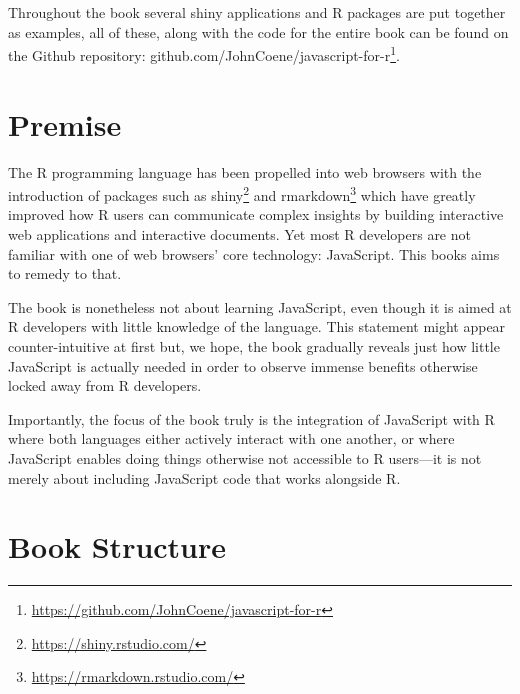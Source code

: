 \documentclass[
]{krantz}
\renewcommand{\href}[2]{#2\footnote{\url{#1}}}
\begin{document}
Throughout the book several shiny applications and R packages are put together as examples, all of these, along with the code for the entire book can be found on the Github repository: \href{https://github.com/JohnCoene/javascript-for-r}{github.com/JohnCoene/javascript-for-r}.

\hypertarget{premise}{%
\section*{Premise}\label{premise}}


The R programming language has been propelled into web browsers with the introduction of packages such as \href{https://shiny.rstudio.com/}{shiny} \citep{R-shiny} and \href{https://rmarkdown.rstudio.com/}{rmarkdown} \citep{R-rmarkdown} which have greatly improved how R users can communicate complex insights by building interactive web applications and interactive documents. Yet most R developers are not familiar with one of web browsers' core technology: JavaScript. This books aims to remedy to that.

The book is nonetheless not about learning JavaScript, even though it is aimed at R developers with little knowledge of the language. This statement might appear counter-intuitive at first but, we hope, the book gradually reveals just how little JavaScript is actually needed in order to observe immense benefits otherwise locked away from R developers.

Importantly, the focus of the book truly is the integration of JavaScript with R where both languages either actively interact with one another, or where JavaScript enables doing things otherwise not accessible to R users---it is not merely about including JavaScript code that works alongside R.

\hypertarget{book-structure}{%
\section*{Book Structure}\label{book-structure}}
\end{document}
